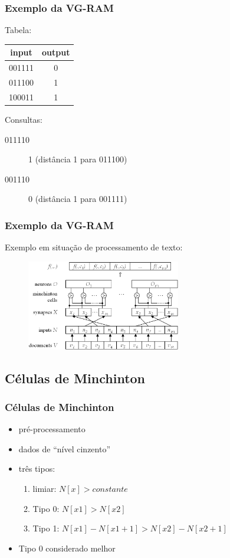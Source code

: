 \documentclass{beamer}
\begin{document}
\begin{frame}
    \frametitle{Exemplo da VG-RAM}
    Tabela:
    \begin{table}
        \centering
        \begin{tabular}{|c|c|}
            \hline
            input &   output\\
            \hline
            001111 & 0\\
            \hline
            011100 & 1\\
            \hline
            100011 & 1\\
            \hline
        \end{tabular}

    \end{table}
    Consultas:
    \begin{description}
        \item[011110] 1 (distância 1 para 011100)
        \item[001110] 0 (distância 1 para 001111)
    \end{description}
\end{frame}
\begin{frame}
    \frametitle{Exemplo da VG-RAM}
    Exemplo em situação de processamento de texto:
    \begin{figure}[htb]
        \begin{center}
            \includegraphics[width=0.6\textwidth]{imagens/arquitetura}
        \end{center}
    \end{figure}
\end{frame}
\subsection{Células de Minchinton}
\begin{frame}
    \frametitle{Células de Minchinton}
    \begin{itemize}
        \item pré-processamento
        \item dados de ``nível cinzento''
        \item três tipos:
            \begin{enumerate}
                \item limiar: $N[x] > constante$
                \item Tipo 0: $N[x1] > N[x2]$
                \item Tipo 1: $N[x1] - N[x1 + 1] > N[x2] - N[x2+1]$
            \end{enumerate}
        \item Tipo 0 considerado melhor
    \end{itemize}
\end{frame}
\end{document}
